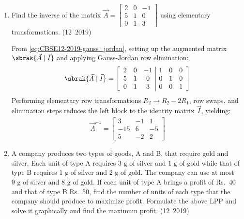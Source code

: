 \begin{enumerate}[label=\thesubsection.\arabic*, ref=\thesubsection.\theenumi]
\item Find the inverse of the matrix $\vec{A} = \begin{bmatrix} 2 & 0 & -1 \\ 5 & 1 & 0 \\ 0 & 1 & 3 \end{bmatrix}$ using elementary transformations.
\hfill (12~2019)

\solution
From \eqref{eq:CBSE12-2019-gauss_jordan}, setting up the augmented matrix $\sbrak{\vec{A} \mid \vec{I}}$ and applying Gauss-Jordan row elimination:
\begin{align}
	\sbrak{\vec{A} \mid \vec{I}} = \left[\begin{array}{ccc|ccc} 2 & 0 & -1 & 1 & 0 & 0 \\ 5 & 1 & 0 & 0 & 1 & 0 \\ 0 & 1 & 3 & 0 & 0 & 1 \end{array}\right]
\end{align}
Performing elementary row transformations $R_2 \to R_2 - 2R_1$, row swaps, and elimination steps reduces the left block to the identity matrix $\vec{I}$, yielding:
\begin{align}
	\vec{A}^{-1} = \begin{bmatrix}
		3 & -1 & 1 \\
		-15 & 6 & -5 \\
		5 & -2 & 2
	\end{bmatrix}
\end{align}


\item A company produces two types of goods, A and B, that require gold and silver. Each unit of type A requires $3\text{ g}$ of silver and $1\text{ g}$ of gold while that of type B requires $1\text{ g}$ of silver and $2\text{ g}$ of gold. The company can use at most $9\text{ g}$ of silver and $8\text{ g}$ of gold. If each unit of type A brings a profit of Rs.~40 and that of type B Rs.~50, find the number of units of each type that the company should produce to maximize profit. Formulate the above LPP and solve it graphically and find the maximum profit.
\hfill (12~2019)


\end{enumerate}
